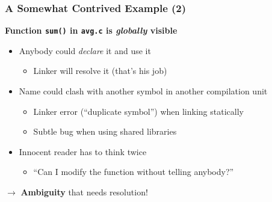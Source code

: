 \begin{frame}
  \frametitle{A Somewhat Contrived Example (2)}

  \textbf{Function \texttt{sum()} in \texttt{avg.c} is
    \textit{globally} visible}

  \begin{itemize}
  \item Anybody could \textit{declare} it and use it
    \begin{itemize}
    \item Linker will resolve it (that's his job)
    \end{itemize}
  \item Name could clash with another symbol in another compilation
    unit
    \begin{itemize}
    \item Linker error (``duplicate symbol'') when linking statically
    \item Subtle bug when using shared libraries
    \end{itemize}
  \item Innocent reader has to think twice
    \begin{itemize}
    \item ``Can I modify the function without telling anybody?''
    \end{itemize}
  \end{itemize}

  $\to$ \textbf{Ambiguity} that needs resolution!

\end{frame}

